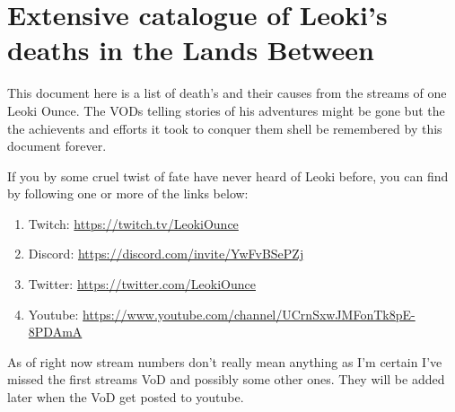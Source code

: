 \section*{Extensive catalogue of Leoki's deaths in the Lands Between}

This document here is a list of death's and their causes from the streams of one Leoki Ounce. The VODs telling stories of his adventures might be gone but the the achievents and efforts it took to conquer them shell be remembered by this document forever.

If you by some cruel twist of fate have never heard of Leoki before, you can find by following one or more of the links below:
\begin{enumerate}[label = \textbullet]
    \item Twitch: \href{https://twitch.tv/LeokiOunce}{https://twitch.tv/LeokiOunce}
    \item Discord: \href{https://discord.com/invite/YwFvBSePZj}{https://discord.com/invite/YwFvBSePZj}
    \item Twitter: \href{https://twitter.com/LeokiOunce}{https://twitter.com/LeokiOunce}
    \item Youtube: \href{https://www.youtube.com/channel/UCrnSxwJMFonTk8pE-8PDAmA}{https://www.youtube.com/channel/UCrnSxwJMFonTk8pE-8PDAmA}
\end{enumerate}

As of right now stream numbers don't really mean anything as I'm certain I've missed the first streams VoD and possibly some other ones. They will be added later when the VoD get posted to youtube.